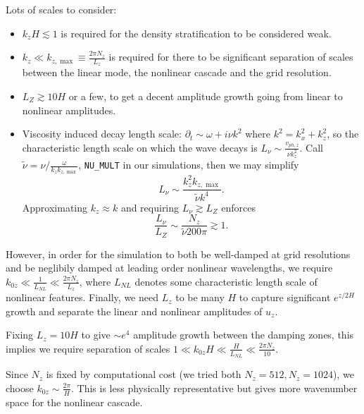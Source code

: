 \documentclass[11pt,
        usenames, %
        dvipsnames %
    ]{report}
\begin{document}
Lots of scales to consider:
\begin{itemize}
    \item $k_zH \lesssim 1$ is required for the density stratification to be
        considered weak.

    \item $k_z \ll k_{z, \max} \equiv \frac{2\pi N_z}{L_z}$ is required for
        there to be significant separation of scales between the linear mode,
        the nonlinear cascade and the grid resolution.

    \item $L_Z \gtrsim 10H$ or a few, to get a decent amplitude growth going
        from linear to nonlinear amplitudes.

    \item Viscosity induced decay length scale: $\partial_t \sim \omega + i\nu
        k^2$ where $k^2 = k_x^2 + k_z^2$, so the characteristic length scale on
        which the wave decays is $L_\nu \sim \frac{v_{ph, z}}{\nu k_z^2}$. Call
        $\tilde{\nu} = \nu / \frac{\omega}{k_zk_{z, \max}}$, \lstinline{NU_MULT}
        in our simulations, then we may simplify
        \begin{equation}
            L_\nu \sim \frac{k_z^2k_{z, \max}}{\tilde{\nu}k^4}.
        \end{equation}
        Approximating $k_z \approx k$ and requiring $L_\nu \gtrsim L_Z$ enforces
        \begin{equation}
            \frac{L_\nu}{L_Z} \sim \frac{N_z}{\tilde{\nu}200\pi} \gtrsim 1.
        \end{equation}
\end{itemize}

However, in order for the simulation to both be well-damped
at grid resolutions and be neglibily damped at leading order nonlinear
wavelengths, we require $k_{0z} \ll \frac{1}{L_{NL}} \ll \frac{2\pi
N_z}{L_z}$, where $L_{NL}$ denotes some characteristic length scale of
nonlinear features. Finally, we need $L_z$ to be many $H$ to capture
significant $e^{z/2H}$ growth and separate the linear and nonlinear
amplitudes of $u_z$.

Fixing $L_z = 10H$ to give $\sim e^4$ amplitude growth between the
damping zones, this implies we require separation of scales $1 \ll
k_{0z}H \ll \frac{H}{L_{NL}} \ll \frac{2\pi N_z}{10}$.

Since $N_z$ is fixed by computational cost (we tried both $N_z = 512,
N_z = 1024$), we choose $k_{0z} \sim \frac{2\pi}{H}$. This is less
physically representative but gives more wavenumber space for the
nonlinear cascade.
\end{document}

